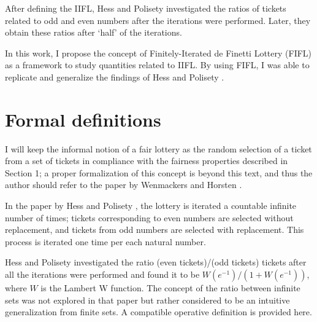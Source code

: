 \documentclass{article}
\newcommand{\ppar}[1]{\left( #1 \right)}
\begin{document}
After defining the IIFL, Hess and Polisety \cite{hess2023} investigated the ratios of tickets related to odd and even numbers after the iterations were performed.
%
Later, they obtain these ratios after `half' of the iterations.

In this work, I propose the concept of Finitely-Iterated de Finetti Lottery (FIFL) as a framework to study quantities related to IIFL.
%
By using FIFL, I was able to replicate and generalize the findings of Hess and Polisety \cite{hess2023}.


\section{Formal definitions}

I will keep the informal notion of a fair lottery as the random selection of a ticket from a set of tickets in compliance with the fairness properties described in Section 1;
%
a proper formalization of this concept is beyond this text, and thus the author should refer to the paper by Wenmackers and Horsten \cite{fair_infinite_lottery}.

%
%

In the paper by Hess and Polisety \cite{hess2023}, the lottery is iterated a countable infinite number of times; tickets corresponding to even numbers are selected without replacement, and tickets from odd numbers are selected with replacement.
%
This process is iterated one time per each natural number.

Hess and Polisety investigated the ratio (even tickets)/(odd tickets) tickets after all the iterations were performed and found it to be 
$W\ppar{e^{-1}}/\ppar{1+W\ppar{e^{-1}}}$, where $W$ is the Lambert W function.
%
The concept of the ratio between infinite sets was not explored in that paper but rather considered to be an intuitive generalization from finite sets.
%
A compatible operative definition is provided here.
\end{document}
